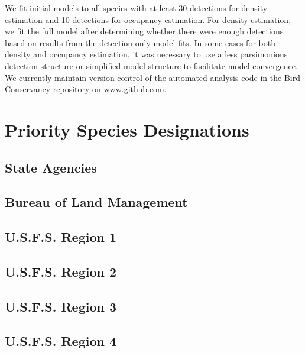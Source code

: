 \documentclass[
  letterpaper,
  DIV=11,
  numbers=noendperiod,
  oneside]{scrreprt}
\begin{document}
We fit initial models to all species with at least 30 detections for
density estimation and 10 detections for occupancy estimation. For
density estimation, we fit the full model after determining whether
there were enough detections based on results from the detection-only
model fits. In some cases for both density and occupancy estimation, it
was necessary to use a less parsimonious detection structure or
simplified model structure to facilitate model convergence. We currently
maintain version control of the automated analysis code in the Bird
Conservancy repository on www.github.com.

\hypertarget{priority-species-designations}{%
\chapter{Priority Species
Designations}\label{priority-species-designations}}

\hypertarget{state-agencies}{%
\section{State Agencies}\label{state-agencies}}

\hypertarget{bureau-of-land-management-1}{%
\section{Bureau of Land Management}\label{bureau-of-land-management-1}}

\hypertarget{u.s.f.s.-region-1}{%
\section{U.S.F.S. Region 1}\label{u.s.f.s.-region-1}}

\hypertarget{u.s.f.s.-region-2}{%
\section{U.S.F.S. Region 2}\label{u.s.f.s.-region-2}}

\hypertarget{u.s.f.s.-region-3}{%
\section{U.S.F.S. Region 3}\label{u.s.f.s.-region-3}}

\hypertarget{u.s.f.s.-region-4}{%
\section{U.S.F.S. Region 4}\label{u.s.f.s.-region-4}}
\end{document}
